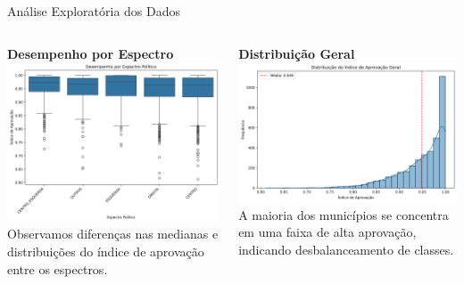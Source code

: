 \documentclass{beamer}
\begin{document}
\begin{frame}{Análise Exploratória dos Dados}
    \begin{columns}[T]
        \begin{column}{0.5\textwidth}
            \textbf{Desempenho por Espectro}
            \includegraphics[width=\textwidth]{assets/desempenho_espectro.png}
            \tiny Observamos diferenças nas medianas e distribuições do índice de aprovação entre os espectros.
        \end{column}
        \begin{column}{0.5\textwidth}
            \textbf{Distribuição Geral}
            \includegraphics[width=\textwidth]{assets/distribuicao_indice.png}
            \tiny A maioria dos municípios se concentra em uma faixa de alta aprovação, indicando desbalanceamento de classes.
        \end{column}
    \end{columns}
\end{frame}
\end{document}
